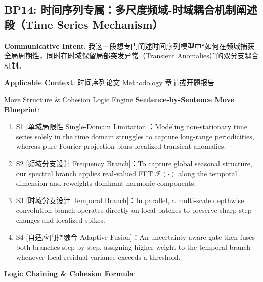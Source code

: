 \subsection{BP14: 时间序列专属：多尺度频域-时域耦合机制阐述段（Time Series Mechanism）}\label{sec:bp:BP14}
\noindent\textbf{\color{AcadNavy}Communicative Intent}: 我这一段想专门阐述时间序列模型中“如何在频域捕获全局周期性，同时在时域保留局部突发异常（Transient Anomalies）”的双分支耦合机制。\par\vspace{2pt}
\noindent\textbf{\color{AcadSlate}Applicable Context}: 时间序列论文 Methodology 章节或开题报告\par\vspace{4pt}
\begin{ConceptBox}{Move Structure \& Cohesion Logic Engine}
\textbf{Sentence-by-Sentence Move Blueprint}:
\begin{enumerate}[label=\textbf{\color{AcadNavy}S\arabic*.}, leftmargin=2em, itemsep=2pt]
  \item S1 [单域局限性 Single-Domain Limitation]：Modeling non-stationary time series solely in the time domain struggles to capture long-range periodicities, whereas pure Fourier projection blurs localized transient anomalies.
  \item S2 [频域分支设计 Frequency Branch]：To capture global seasonal structure, our spectral branch applies real-valued FFT $\mathcal{F}(\cdot)$ along the temporal dimension and reweights dominant harmonic components.
  \item S3 [时域分支设计 Temporal Branch]：In parallel, a multi-scale depthwise convolution branch operates directly on local patches to preserve sharp step changes and localized spikes.
  \item S4 [自适应门控融合 Adaptive Fusion]：An uncertainty-aware gate then fuses both branches step-by-step, assigning higher weight to the temporal branch whenever local residual variance exceeds a threshold.
\end{enumerate}\par\vspace{4pt}
\textbf{Logic Chaining \& Cohesion Formula}:\par{}
\end{ConceptBox}
